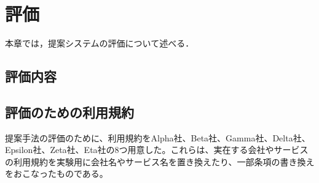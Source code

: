 \chapter{評価}
\label{discussion}
本章では，提案システムの評価について述べる．

\section{評価内容}

\section{評価のための利用規約}
提案手法の評価のために、利用規約をAlpha社、Beta社、Gamma社、Delta社、Epsilon社、Zeta社、Eta社の8つ用意した。これらは、実在する会社やサービスの利用規約を実験用に会社名やサービス名を置き換えたり、一部条項の書き換えをおこなったものである。


